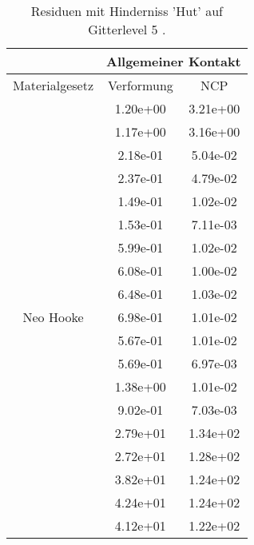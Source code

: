 \begin{table} 
\centering 
\begin{tabular}{c|cc|} 
\cline{2-3} 
 & \multicolumn{2}{|c|}{Allgemeiner Kontakt} \\ 
\hline 
\multicolumn{1}{|c|}{Materialgesetz} & \multicolumn{1}{c|}{Verformung} & \multicolumn{1}{c|}{NCP} \\ 
\hline 
\multicolumn{1}{|c|}{\multirow{19}{*}{Neo Hooke}} &\multicolumn{1}{|c|}{  1.20e+00} & \multicolumn{1}{|c|}{  3.21e+00} \\ 
\multicolumn{1}{|c|}{} & \multicolumn{1}{|c|}{  1.17e+00} & \multicolumn{1}{|c|}{  3.16e+00} \\ 
\multicolumn{1}{|c|}{} & \multicolumn{1}{|c|}{  2.18e-01} & \multicolumn{1}{|c|}{  5.04e-02} \\ 
\multicolumn{1}{|c|}{} & \multicolumn{1}{|c|}{  2.37e-01} & \multicolumn{1}{|c|}{  4.79e-02} \\ 
\multicolumn{1}{|c|}{} & \multicolumn{1}{|c|}{  1.49e-01} & \multicolumn{1}{|c|}{  1.02e-02} \\ 
\multicolumn{1}{|c|}{} & \multicolumn{1}{|c|}{  1.53e-01} & \multicolumn{1}{|c|}{  7.11e-03} \\ 
\multicolumn{1}{|c|}{} & \multicolumn{1}{|c|}{  5.99e-01} & \multicolumn{1}{|c|}{  1.02e-02} \\ 
\multicolumn{1}{|c|}{} & \multicolumn{1}{|c|}{  6.08e-01} & \multicolumn{1}{|c|}{  1.00e-02} \\ 
\multicolumn{1}{|c|}{} & \multicolumn{1}{|c|}{  6.48e-01} & \multicolumn{1}{|c|}{  1.03e-02} \\ 
\multicolumn{1}{|c|}{} & \multicolumn{1}{|c|}{  6.98e-01} & \multicolumn{1}{|c|}{  1.01e-02} \\ 
\multicolumn{1}{|c|}{} & \multicolumn{1}{|c|}{  5.67e-01} & \multicolumn{1}{|c|}{  1.01e-02} \\ 
\multicolumn{1}{|c|}{} & \multicolumn{1}{|c|}{  5.69e-01} & \multicolumn{1}{|c|}{  6.97e-03} \\ 
\multicolumn{1}{|c|}{} & \multicolumn{1}{|c|}{  1.38e+00} & \multicolumn{1}{|c|}{  1.01e-02} \\ 
\multicolumn{1}{|c|}{} & \multicolumn{1}{|c|}{  9.02e-01} & \multicolumn{1}{|c|}{  7.03e-03} \\ 
\multicolumn{1}{|c|}{} & \multicolumn{1}{|c|}{  2.79e+01} & \multicolumn{1}{|c|}{  1.34e+02} \\ 
\multicolumn{1}{|c|}{} & \multicolumn{1}{|c|}{  2.72e+01} & \multicolumn{1}{|c|}{  1.28e+02} \\ 
\multicolumn{1}{|c|}{} & \multicolumn{1}{|c|}{  3.82e+01} & \multicolumn{1}{|c|}{  1.24e+02} \\ 
\multicolumn{1}{|c|}{} & \multicolumn{1}{|c|}{  4.24e+01} & \multicolumn{1}{|c|}{  1.24e+02} \\ 
\multicolumn{1}{|c|}{} & \multicolumn{1}{|c|}{  4.12e+01} & \multicolumn{1}{|c|}{  1.22e+02} \\ 
\hline 
\end{tabular}\caption{Residuen mit Hinderniss 'Hut' auf Gitterlevel 5 .}\label{tab:Residuum_Hut_level5}
\end{table} 
